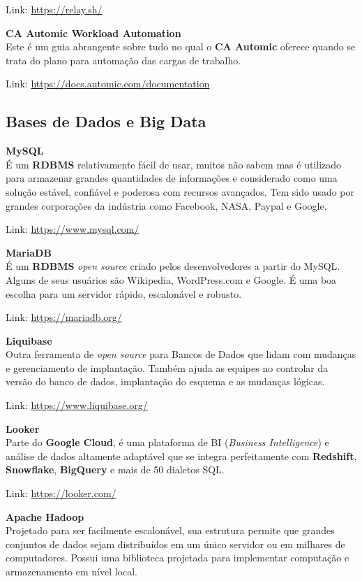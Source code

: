 \documentclass[fleqn,10pt]{SelfArx} %
\begin{document}
Link: \url{https://relay.sh/}

\textbf{CA Automic Workload Automation} \\
Este é um guia abrangente sobre tudo no qual o \textbf{CA Automic} oferece quando se trata do plano para automação das cargas de trabalho.

Link: \url{https://docs.automic.com/documentation}

\subsection*{Bases de Dados e Big Data}

\textbf{MySQL} \\
É um \textbf{RDBMS} relativamente fácil de usar, muitos não sabem mas é utilizado para armazenar grandes quantidades de informações e considerado como uma solução estável, confiável e poderosa com recursos avançados. Tem sido usado por grandes corporações da indústria como Facebook, NASA, Paypal e Google.

Link: \url{https://www.mysql.com/}

\textbf{MariaDB} \\
É um \textbf{RDBMS} \textit{open source} criado pelos desenvolvedores a partir do MySQL. Alguns de seus usuários são Wikipedia, WordPress.com e Google. É uma boa escolha para um servidor rápido, escalonável e robusto.

Link: \url{https://mariadb.org/}

\textbf{Liquibase} \\
Outra ferramenta de \textit{open source} para Bancos de Dados que lidam com mudanças e gerenciamento de implantação. Também ajuda as equipes no controlar da versão do banco de dados, implantação do esquema e as mudanças lógicas.

Link: \url{https://www.liquibase.org/}

\textbf{Looker} \\
Parte do \textbf{Google Cloud}, é uma plataforma de BI (\textit{Business Intelligence}) e análise de dados altamente adaptável que se integra perfeitamente com \textbf{Redshift}, \textbf{Snowflake}, \textbf{BigQuery} e mais de 50 dialetos SQL.

Link: \url{https://looker.com/}

\textbf{Apache Hadoop} \\
Projetado para ser facilmente escalonável, sua estrutura permite que grandes conjuntos de dados sejam distribuídos em um único servidor ou em milhares de computadores. Possui uma biblioteca projetada para implementar computação e armazenamento em nível local.
\end{document}
